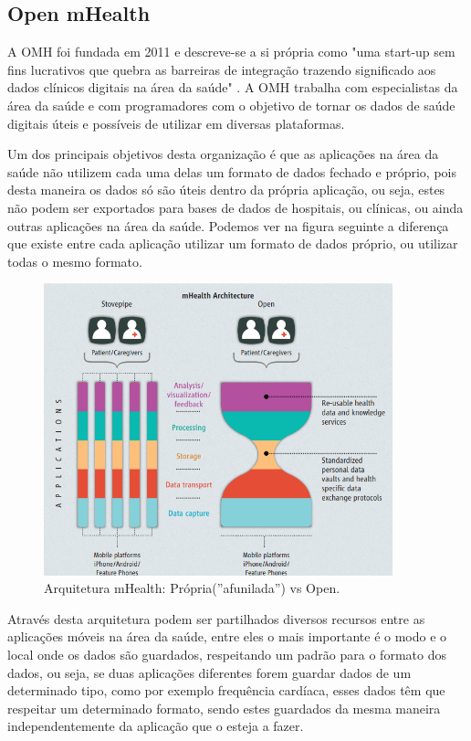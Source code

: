 \subsection{Open mHealth}

A \gls{OMH} foi fundada em 2011 e descreve-se a si própria como "uma start-up sem fins lucrativos que quebra as barreiras de integração trazendo significado aos dados clínicos digitais na área da saúde" \cite{omhabout}. A \gls{OMH} trabalha com especialistas da área da saúde e com programadores com o objetivo de tornar os dados de saúde digitais úteis e possíveis de utilizar em diversas plataformas. 
\par 
Um dos principais objetivos desta organização é que as aplicações na área da saúde não utilizem cada uma delas um formato de dados fechado e próprio, pois desta maneira os dados só são úteis dentro da própria aplicação, ou seja, estes não podem ser exportados para bases de dados de hospitais, ou clínicas, ou ainda outras aplicações na área da saúde. Podemos ver na figura seguinte a diferença que existe entre cada aplicação utilizar um formato de dados próprio, ou utilizar todas o mesmo formato\cite{omharticle}.

\begin{figure}[!ht]
  \centering
  \includegraphics[width=0.9\textwidth]{imgs/openmharch.png}
  \caption[Arquitetura mHealth: Própria(''afunilada'') vs Open]{Arquitetura mHealth: Própria(''afunilada'') vs Open. \cite{omharticle}}
  
  \label{f:omharch}
\end{figure}

Através desta arquitetura podem ser partilhados diversos recursos entre as aplicações móveis na área da saúde, entre eles o mais importante é o modo e o local onde os dados são guardados, respeitando um padrão para o formato dos dados, ou seja, se duas aplicações diferentes forem guardar dados de um determinado tipo, como por exemplo frequência cardíaca, esses dados têm que respeitar um determinado formato, sendo estes guardados da mesma maneira independentemente da aplicação que o esteja a fazer.
\par 

